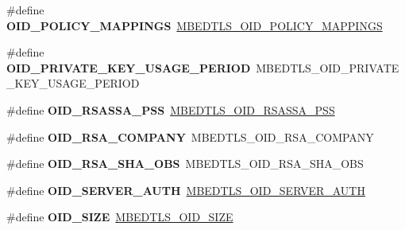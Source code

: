 \begin{DoxyCompactItemize}
\item 
\mbox{\label{compat-1_83_8h_a06bec752671e308c911efe42d4d1e34d}} 
\#define {\bfseries O\+I\+D\+\_\+\+P\+O\+L\+I\+C\+Y\+\_\+\+M\+A\+P\+P\+I\+N\+GS}~\mbox{\hyperlink{oid_8h_a60cb6904e309c47c39d370beaf54007c}{M\+B\+E\+D\+T\+L\+S\+\_\+\+O\+I\+D\+\_\+\+P\+O\+L\+I\+C\+Y\+\_\+\+M\+A\+P\+P\+I\+N\+GS}}
\item 
\mbox{\label{compat-1_83_8h_a970d989aeb2efe0725ee58f4cced13da}} 
\#define {\bfseries O\+I\+D\+\_\+\+P\+R\+I\+V\+A\+T\+E\+\_\+\+K\+E\+Y\+\_\+\+U\+S\+A\+G\+E\+\_\+\+P\+E\+R\+I\+OD}~M\+B\+E\+D\+T\+L\+S\+\_\+\+O\+I\+D\+\_\+\+P\+R\+I\+V\+A\+T\+E\+\_\+\+K\+E\+Y\+\_\+\+U\+S\+A\+G\+E\+\_\+\+P\+E\+R\+I\+OD
\item 
\mbox{\label{compat-1_83_8h_a5856e4fcda85ab1ebeb36380e36d7862}} 
\#define {\bfseries O\+I\+D\+\_\+\+R\+S\+A\+S\+S\+A\+\_\+\+P\+SS}~\mbox{\hyperlink{oid_8h_aae3c0457fb260acc7811e4f54c7c407d}{M\+B\+E\+D\+T\+L\+S\+\_\+\+O\+I\+D\+\_\+\+R\+S\+A\+S\+S\+A\+\_\+\+P\+SS}}
\item 
\mbox{\label{compat-1_83_8h_a51dfb66259013d79b8c6bbcd19a7bf24}} 
\#define {\bfseries O\+I\+D\+\_\+\+R\+S\+A\+\_\+\+C\+O\+M\+P\+A\+NY}~M\+B\+E\+D\+T\+L\+S\+\_\+\+O\+I\+D\+\_\+\+R\+S\+A\+\_\+\+C\+O\+M\+P\+A\+NY
\item 
\mbox{\label{compat-1_83_8h_a7e1d8297adb1372fb76dc3982443d315}} 
\#define {\bfseries O\+I\+D\+\_\+\+R\+S\+A\+\_\+\+S\+H\+A\+\_\+\+O\+BS}~M\+B\+E\+D\+T\+L\+S\+\_\+\+O\+I\+D\+\_\+\+R\+S\+A\+\_\+\+S\+H\+A\+\_\+\+O\+BS
\item 
\mbox{\label{compat-1_83_8h_afdd101bc31005e07fb0d9c1d62c6a959}} 
\#define {\bfseries O\+I\+D\+\_\+\+S\+E\+R\+V\+E\+R\+\_\+\+A\+U\+TH}~\mbox{\hyperlink{oid_8h_ab47804622cec9a9e021efcd12e22b6bf}{M\+B\+E\+D\+T\+L\+S\+\_\+\+O\+I\+D\+\_\+\+S\+E\+R\+V\+E\+R\+\_\+\+A\+U\+TH}}
\item 
\mbox{\label{compat-1_83_8h_af5cd733470c4214f9f38d0a1e042e590}} 
\#define {\bfseries O\+I\+D\+\_\+\+S\+I\+ZE}~\mbox{\hyperlink{asn1_8h_ac2f2e00874ca486c912c33bb4f7bb16a}{M\+B\+E\+D\+T\+L\+S\+\_\+\+O\+I\+D\+\_\+\+S\+I\+ZE}}
\item 
\mbox{\label{compat-1_83_8h_afd2b89d58fe5192c94b67248c1815958}} 

\end{DoxyCompactItemize}
